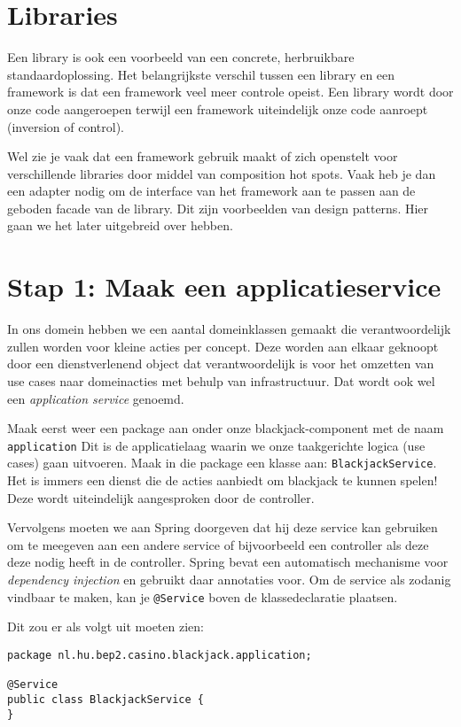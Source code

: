 \documentclass[dutch,a4paper,12pt,doubleside]{book}
\begin{document}
\section{Libraries}
Een library is ook een voorbeeld van een concrete, herbruikbare standaardoplossing.
Het belangrijkste verschil tussen een library en een framework is dat 
een framework veel meer controle opeist. Een library wordt door onze code aangeroepen
terwijl een framework uiteindelijk onze code aanroept (inversion of control).

Wel zie je vaak dat een framework gebruik maakt of zich openstelt voor verschillende
libraries door middel van composition hot spots. Vaak heb je dan een adapter nodig 
om de interface van het framework aan te passen aan de geboden facade van de library.
Dit zijn voorbeelden van design patterns. Hier gaan we het later uitgebreid over hebben.

\section{Stap 1: Maak een applicatieservice}
In ons domein hebben we een aantal domeinklassen gemaakt die verantwoordelijk 
zullen worden voor kleine acties per concept. Deze worden aan elkaar geknoopt 
door een dienstverlenend object dat verantwoordelijk is voor het omzetten van 
use cases naar domeinacties met behulp van infrastructuur. 
Dat wordt ook wel een \textit{application service} genoemd.

Maak eerst weer een package aan onder onze blackjack-component met de naam \texttt{application}
Dit is de applicatielaag waarin we onze taakgerichte logica (use cases) gaan uitvoeren.
Maak in die package een klasse aan: \texttt{BlackjackService}.
Het is immers een dienst die de acties aanbiedt om blackjack te kunnen spelen!
Deze wordt uiteindelijk aangesproken door de controller.

Vervolgens moeten we aan Spring doorgeven dat hij deze service kan gebruiken 
om te meegeven aan een andere service of bijvoorbeeld een controller als deze 
deze nodig heeft in de controller. Spring bevat een automatisch mechanisme 
voor \textit{dependency injection} en gebruikt daar annotaties voor. Om de service 
als zodanig vindbaar te maken, kan je \texttt{@Service} boven de klassedeclaratie plaatsen.

Dit zou er als volgt uit moeten zien:
\begin{verbatim}
package nl.hu.bep2.casino.blackjack.application;

@Service
public class BlackjackService {
}
\end{verbatim}
\end{document}
